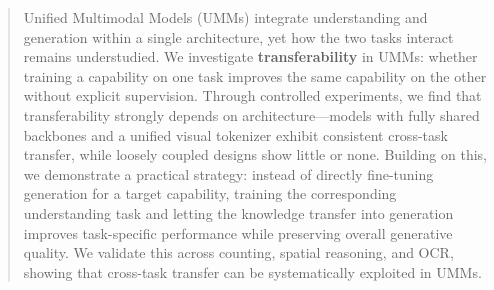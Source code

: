 \documentclass[runningheads]{llncs}
\begin{document}
\begin{abstract}
Unified Multimodal Models (UMMs) integrate understanding and generation within a single architecture, yet how the two tasks interact remains understudied. We investigate \textbf{transferability} in UMMs: whether training a capability on one task improves the same capability on the other without explicit supervision. Through controlled experiments, we find that transferability strongly depends on architecture—models with fully shared backbones and a unified visual tokenizer exhibit consistent cross-task transfer, while loosely coupled designs show little or none. Building on this, we demonstrate a practical strategy: instead of directly fine-tuning generation for a target capability, training the corresponding understanding task and letting the knowledge transfer into generation improves task-specific performance while preserving overall generative quality. We validate this across counting, spatial reasoning, and OCR, showing that cross-task transfer can be systematically exploited in UMMs.


\end{abstract}
\end{document}
